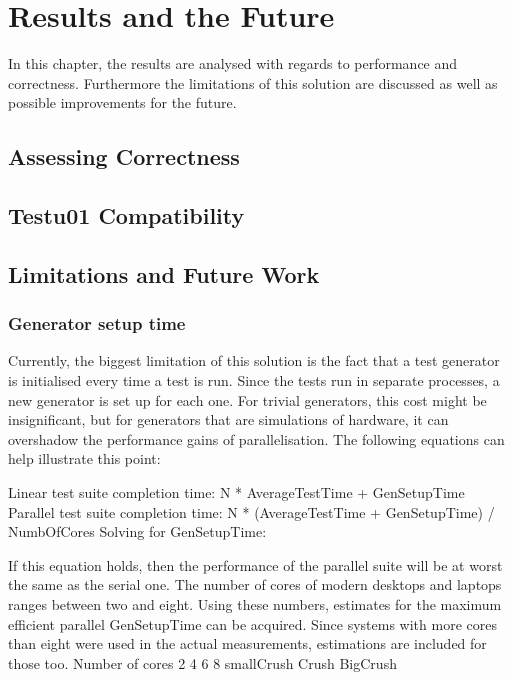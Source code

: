 \chapter{Results and the Future}
\label{cha:results}
In this chapter, the results are analysed with regards to performance and correctness. Furthermore the limitations of this solution are discussed as well as possible improvements for the future.

\section{Assessing Correctness}

\section{Testu01 Compatibility}

\section{Limitations and Future Work}
\subsection{Generator setup time}
Currently, the biggest limitation of this solution is the fact that a test generator is initialised every time a test is run. Since the tests run in separate processes, a new generator is set up for each one.
For trivial generators, this cost might be insignificant, but for generators that are simulations of hardware, it can overshadow the performance gains of parallelisation. The following equations can help illustrate this point:

Linear test suite completion time: N * AverageTestTime + GenSetupTime
Parallel test suite completion time: N * (AverageTestTime + GenSetupTime) / NumbOfCores
Solving for GenSetupTime:

If this equation holds, then the performance of the parallel suite will be at worst the same as the serial one.
The number of cores of modern desktops and laptops ranges between two and eight. Using these numbers, estimates for the maximum efficient parallel GenSetupTime can be acquired. Since systems with more cores than eight were used in the actual measurements, estimations are included for those too.
Number of cores
2 4 6 8
smallCrush
Crush
BigCrush


